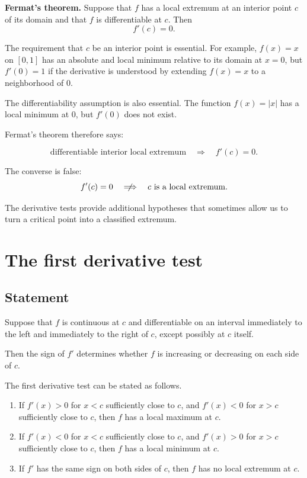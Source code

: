 \documentclass{essay}
\begin{document}
\medskip

\noindent
\textbf{Fermat's theorem.}
Suppose that \(f\) has a local extremum at an interior point \(c\) of its domain and that \(f\) is differentiable at \(c\). Then
\[ f'(c)=0. \]

\medskip

The requirement that \(c\) be an interior point is essential. For example, \(f(x)=x\) on \([0,1]\) has an absolute and local minimum relative to its domain at \(x=0\), but \(f'(0)=1\) if the derivative is understood by extending \(f(x)=x\) to a neighborhood of \(0\).

The differentiability assumption is also essential. The function \(f(x)=|x|\) has a local minimum at \(0\), but \(f'(0)\) does not exist.

Fermat's theorem therefore says:

\[ \text{differentiable interior local extremum} \quad\Longrightarrow\quad f'(c)=0. \]

The converse is false:
\[
  f'(c)=0
  \quad\centernot\Longrightarrow\quad
  \text{\(c\) is a local extremum}.
\]

The derivative tests provide additional hypotheses that sometimes allow us to turn a critical point into a classified extremum.

\section{The first derivative test}

\subsection{Statement}

Suppose that \(f\) is continuous at \(c\) and differentiable on an interval immediately to the left and immediately to the right of \(c\), except possibly at \(c\) itself.

Then the sign of \(f'\) determines whether \(f\) is increasing or decreasing on each side of \(c\).

The first derivative test can be stated as follows.

\begin{enumerate}
  \item If \(f'(x)>0\) for \(x<c\) sufficiently close to \(c\), and \(f'(x)<0\) for \(x>c\) sufficiently close to \(c\), then \(f\) has a local maximum at \(c\).

  \item If \(f'(x)<0\) for \(x<c\) sufficiently close to \(c\), and \(f'(x)>0\) for \(x>c\) sufficiently close to \(c\), then \(f\) has a local minimum at \(c\).

  \item If \(f'\) has the same sign on both sides of \(c\), then \(f\) has no local extremum at \(c\).
\end{enumerate}
\end{document}

